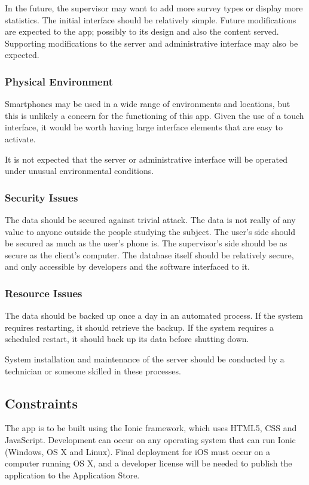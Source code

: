 \documentclass[a4paper, 11pt, titlepage]{article}
\begin{document}
In the future, the supervisor may want to add more survey types or display more statistics.
The initial interface should be relatively simple. Future modifications are expected to the app; possibly to its design and also the content served. Supporting modifications to the server and administrative interface may also be expected.

\subsubsection{Physical Environment}
Smartphones may be used in a wide range of environments and locations, but this is unlikely a concern for the functioning of this app. Given the use of a touch interface, it would be worth having large interface elements that are easy to activate. 

It is not expected that the server or administrative interface will be operated under unusual environmental conditions.

\subsubsection{Security Issues}
The data should be secured against trivial attack. The data is not really of any value to anyone outside the people studying the subject. The user's side should be secured as much as the user's phone is. The supervisor's side should be as secure as the client's computer. The database itself should be relatively secure, and only accessible by developers and the software interfaced to it.

\subsubsection{Resource Issues}
The data should be backed up once a day in an automated process.
If the system requires restarting, it should retrieve the backup.
If the system requires a scheduled restart, it should back up its data before shutting down.

System installation and maintenance of the server should be conducted by a technician or someone skilled in these processes.

\subsection{Constraints}
The app is to be built using the Ionic framework, which uses HTML5, CSS and JavaScript. Development can occur on any operating system that can run Ionic (Windows, OS X and Linux). Final deployment for iOS must occur on a computer running OS X, and a developer license will be needed to publish the application to the Application Store.
\end{document}
